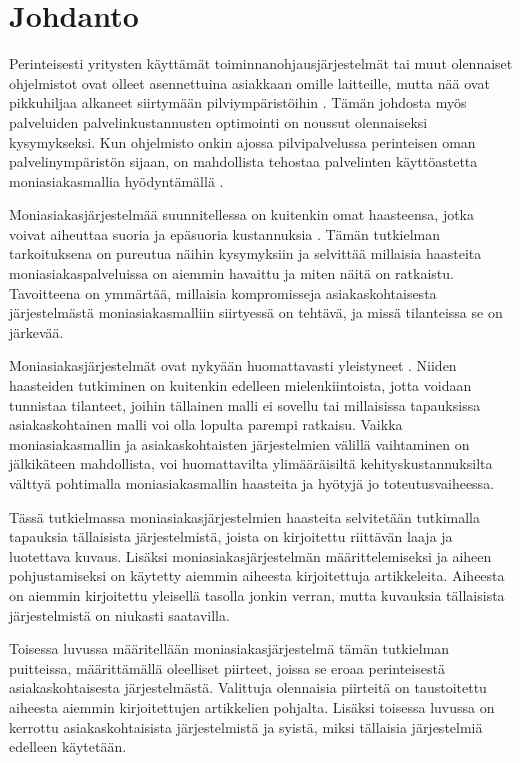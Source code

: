 \chapter{Johdanto}
Perinteisesti yritysten käyttämät toiminnanohjausjärjestelmät tai muut olennaiset ohjelmistot ovat olleet asennettuina asiakkaan omille laitteille, mutta nää ovat pikkuhiljaa alkaneet siirtymään pilviympäristöihin \cite{kaplan2007saas}. Tämän johdosta myös palveluiden palvelinkustannusten optimointi on noussut olennaiseksi kysymykseksi. Kun ohjelmisto onkin ajossa pilvipalvelussa perinteisen oman palvelinympäristön sijaan, on mahdollista tehostaa palvelinten käyttöastetta moniasiakasmallia hyödyntämällä \cite{momm2011qualitative}.

Moniasiakasjärjestelmää suunnitellessa on kuitenkin omat haasteensa, jotka voivat aiheuttaa suoria ja epäsuoria kustannuksia \cite{bezemer2010multi}. Tämän tutkielman tarkoituksena on pureutua näihin kysymyksiin ja selvittää millaisia haasteita moniasiakaspalveluissa on aiemmin havaittu ja miten näitä on ratkaistu. Tavoitteena on ymmärtää, millaisia kompromisseja asiakaskohtaisesta järjestelmästä moniasiakasmalliin siirtyessä on tehtävä, ja missä tilanteissa se on järkevää.

Moniasiakasjärjestelmät ovat nykyään huomattavasti yleistyneet \cite{kaplan2007saas}. Niiden haasteiden tutkiminen on kuitenkin edelleen mielenkiintoista, jotta voidaan tunnistaa tilanteet, joihin tällainen malli ei sovellu tai millaisissa tapauksissa asiakaskohtainen malli voi olla lopulta parempi ratkaisu. Vaikka moniasiakasmallin ja asiakaskohtaisten järjestelmien välillä vaihtaminen on jälkikäteen mahdollista, voi huomattavilta ylimääräisiltä kehityskustannuksilta \cite{momm2011qualitative} välttyä pohtimalla moniasiakasmallin haasteita ja hyötyjä jo toteutusvaiheessa.

Tässä tutkielmassa moniasiakasjärjestelmien haasteita selvitetään tutkimalla tapauksia tällaisista järjestelmistä, joista on kirjoitettu riittävän laaja ja luotettava kuvaus. Lisäksi moniasiakasjärjestelmän määrittelemiseksi ja aiheen pohjustamiseksi on käytetty aiemmin aiheesta kirjoitettuja artikkeleita. Aiheesta on aiemmin kirjoitettu yleisellä tasolla jonkin verran, mutta kuvauksia tällaisista järjestelmistä on niukasti saatavilla.

Toisessa luvussa määritellään moniasiakasjärjestelmä tämän tutkielman puitteissa, määrittämällä oleelliset piirteet, joissa se eroaa perinteisestä asiakaskohtaisesta järjestelmästä. Valittuja olennaisia piirteitä on taustoitettu aiheesta aiemmin kirjoitettujen artikkelien pohjalta. Lisäksi toisessa luvussa on kerrottu asiakaskohtaisista järjestelmistä ja syistä, miksi tällaisia järjestelmiä edelleen käytetään.


